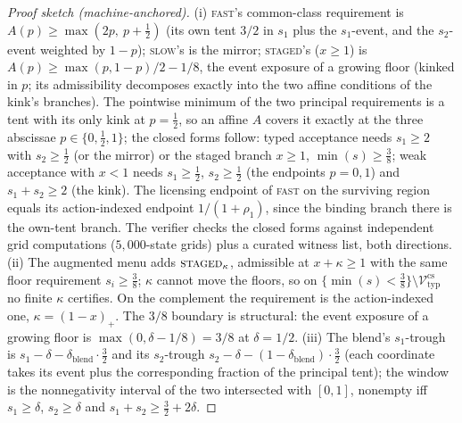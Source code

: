 \documentclass[preprint,11pt,authoryear]{elsarticle}
\theoremstyle{remark}
\newcommand{\Vtyp}{\mathcal{V}_{\mathrm{typ}}}
\newcommand{\act}[1]{\textsc{#1}}
\begin{document}
\begin{proof}[Proof sketch (machine-anchored)]
(i) \act{fast}'s common-class requirement is $A(p)\ge\max(2p,\ p+\tfrac12)$ (its own tent $3/2$ in $s_1$ plus the $s_1$-event, and the $s_2$-event weighted by $1-p$); \act{slow}'s is the mirror; \act{staged}'s ($x\ge1$) is $A(p)\ge\max(p,1-p)/2-1/8$, the event exposure of a growing floor (kinked in $p$; its admissibility decomposes exactly into the two affine conditions of the kink's branches). The pointwise minimum of the two principal requirements is a tent with its only kink at $p=\tfrac12$, so an affine $A$ covers it exactly at the three abscissae $p\in\{0,\tfrac12,1\}$; the closed forms follow: typed acceptance needs $s_1\ge2$ with $s_2\ge\tfrac12$ (or the mirror) or the staged branch $x\ge1$, $\min(s)\ge\tfrac38$; weak acceptance with $x<1$ needs $s_1\ge\tfrac12$, $s_2\ge\tfrac12$ (the endpoints $p=0,1$) and $s_1+s_2\ge2$ (the kink). The licensing endpoint of \act{fast} on the surviving region equals its action-indexed endpoint $1/(1+\rho_1)$, since the binding branch there is the own-tent branch. The verifier checks the closed forms against independent grid computations ($5{,}000$-state grids) plus a curated witness list, both directions.
(ii) The augmented menu adds $\act{staged}_\kappa$, admissible at $x+\kappa\ge1$ with the same floor requirement $s_i\ge\tfrac38$; $\kappa$ cannot move the floors, so on $\{\min(s)<\tfrac38\}\setminus\Vtyp^{\mathrm{cs}}$ no finite $\kappa$ certifies. On the complement the requirement is the action-indexed one, $\kappa=(1-x)_+$. The $3/8$ boundary is structural: the event exposure of a growing floor is $\max(0,\delta-1/8)=3/8$ at $\delta=1/2$.
(iii) The blend's $s_1$-trough is $s_1-\delta-\delta_{\mathrm{blend}}\cdot\tfrac32$ and its $s_2$-trough $s_2-\delta-(1-\delta_{\mathrm{blend}})\cdot\tfrac32$ (each coordinate takes its event plus the corresponding fraction of the principal tent); the window is the nonnegativity interval of the two intersected with $[0,1]$, nonempty iff $s_1\ge\delta$, $s_2\ge\delta$ and $s_1+s_2\ge\tfrac32+2\delta$.
\end{proof}
\end{document}
